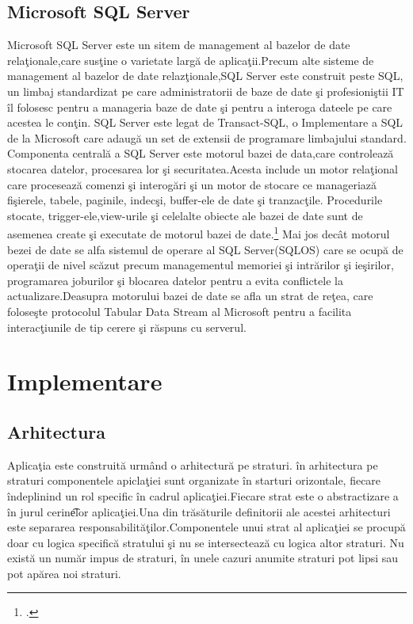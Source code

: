 \documentclass[a4paper,12pt]{report}
\begin{document}
\section{Microsoft SQL Server}
Microsoft SQL Server este un sitem de management al bazelor de date rela\c tionale,care sus\c tine o varietate
larg\u a de aplica\c tii.Precum alte sisteme de management al bazelor de date relaz\c tionale,SQL Server
este construit peste SQL, un limbaj standardizat pe care administratorii de baze de date \c si profesioni\c stii IT
\^il folosesc pentru a manageria baze de date \c si pentru a interoga dateele pe care acestea le con\c tin.
SQL Server este legat de Transact-SQL, o Implementare a SQL de la Microsoft care adaug\u a un set de extensii 
de programare limbajului standard.
Componenta central\u a a SQL Server este motorul bazei de data,care controleaz\u a stocarea datelor, procesarea lor
\c si securitatea.Acesta include un motor rela\c tional care proceseaz\u a comenzi \c si interog\u ari \c si 
un motor de stocare ce manageriaz\u a fi\c sierele, tabele, paginile, indec\c si, buffer-ele de date \c si tranzac\c tile.
Procedurile stocate, trigger-ele,view-urile \c si celelalte obiecte ale bazei de date sunt de asemenea create \c si executate 
de motorul bazei de date.\footcite{sqlServer}
Mai jos dec\^at motorul bezei de date se alfa sistemul de operare al SQL Server(SQLOS) care se ocup\u a
de opera\c tii de nivel sc\u azut precum managementul memoriei \c si intr\u arilor \c si ie\c sirilor, programarea joburilor 
\c si blocarea datelor pentru a evita conflictele la actualizare.Deasupra motorului bazei de date se afla un strat de re\c tea,
care folose\c ste protocolul Tabular Data Stream al Microsoft pentru a facilita interac\c tiunile de tip cerere \c si r\u aspuns
cu serverul.

\chapter{Implementare}

\section{Arhitectura}

Aplica\c tia este construit\u a urm\^and o arhitectur\u a pe straturi.
\^in arhitectura pe straturi componentele apicla\c tiei sunt organizate \^in starturi orizontale,
fiecare \^indeplinind un rol specific \^in cadrul aplica\c tiei.Fiecare strat este o abstractizare 
a \^in jurul cerin\t elor aplica\c tiei.Una din tr\u as\u aturile definitorii ale acestei arhitecturi
este separarea responsabilit\u a\c tilor.Componentele unui strat al aplica\c tiei se procup\u a doar 
cu logica specific\u a stratului \c si nu se intersecteaz\u a cu logica altor straturi.
Nu exist\u a un num\u ar impus de straturi, \^in unele cazuri anumite straturi pot lipsi sau pot 
ap\u area noi straturi.
\end{document}

